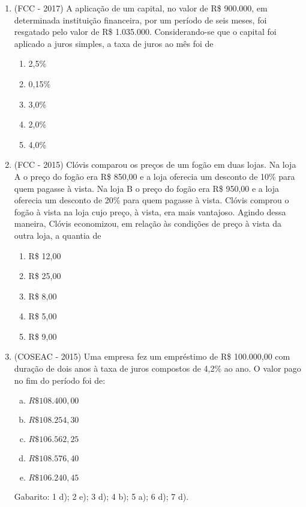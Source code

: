 \begin{enumerate}
  \item (FCC - 2017) A aplicação de um capital, no valor de R\$ 900.000, em determinada instituição financeira, por um período de seis meses, foi resgatado pelo valor de R\$ 1.035.000. Considerando-se que o capital foi aplicado a juros simples, a taxa de juros ao mês foi de
  \begin{enumerate}
  \item 2,5\%
  \item 0,15\%
  \item 3,0\%
  \item 2,0\%
  \item 4,0\%
  \end{enumerate}

  \item (FCC - 2015) Clóvis comparou os preços de um fogão em duas lojas. Na loja A o preço do fogão era R\$ 850,00 e a loja oferecia um desconto de 10\% para quem pagasse à vista. Na loja B o preço do fogão era R\$ 950,00 e a loja oferecia um desconto de 20\% para quem pagasse à vista. Clóvis comprou o fogão à vista na loja cujo preço, à vista, era mais vantajoso. Agindo dessa maneira, Clóvis economizou, em relação às condições de preço à vista da outra loja, a quantia de
  \begin{enumerate}
  \item R\$ 12,00
  \item R\$ 25,00
  \item R\$ 8,00
  \item R\$ 5,00
  \item R\$ 9,00
  \end{enumerate}

    \item (COSEAC - 2015) Uma empresa fez um empréstimo de R\$ 100.000,00 com duração de dois anos à taxa de juros compostos de 4,2\% ao ano. O valor pago no fim do período foi de:
  \begin{enumerate}[a)]
  \item $R\$ 108.400,00$
  \item $R\$ 108.254,30$
  \item $R\$ 106.562,25$
  \item $R\$ 108.576,40$
  \item $R\$ 106.240,45$
  \end{enumerate}


 Gabarito: 1 d); 2 e); 3 d); 4 b); 5 a); 6 d); 7 d).
 \end{enumerate}

 \newpage
